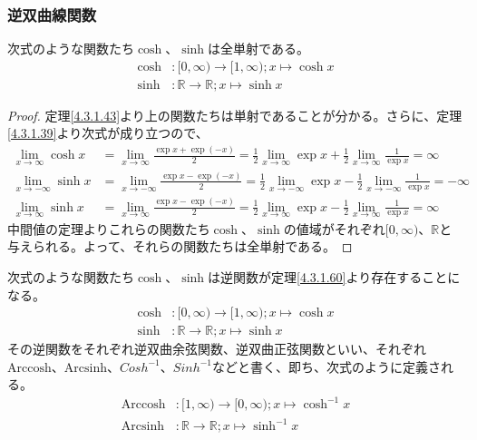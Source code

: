 \documentclass[dvipdfmx]{jsarticle}
\begin{document}
\subsubsection{逆双曲線関数}%
\begin{thm}\label{4.3.1.60} 次式のような関数たち$\cosh$、$\sinh$は全単射である。
\begin{align*}
\cosh&:[ 0,\infty) \rightarrow [ 1,\infty);x \mapsto \cosh x\\
\sinh&:\mathbb{R} \rightarrow \mathbb{R};x \mapsto \sinh x
\end{align*}
\end{thm}
\begin{proof} 定理\ref{4.3.1.43}より上の関数たちは単射であることが分かる。さらに、定理\ref{4.3.1.39}より次式が成り立つので、
\begin{align*}
\lim_{x \rightarrow \infty}{\cosh x} &= \lim_{x \rightarrow \infty}\frac{\exp x + \exp( - x)}{2} = \frac{1}{2}\lim_{x \rightarrow \infty}{\exp x} + \frac{1}{2}\lim_{x \rightarrow \infty}\frac{1}{\exp x} = \infty\\
\lim_{x \rightarrow - \infty}{\sinh x} &= \lim_{x \rightarrow - \infty}\frac{\exp x - \exp( - x)}{2} = \frac{1}{2}\lim_{x \rightarrow - \infty}{\exp x} - \frac{1}{2}\lim_{x \rightarrow - \infty}\frac{1}{\exp x} = - \infty\\
\lim_{x \rightarrow \infty}{\sinh x} &= \lim_{x \rightarrow \infty}\frac{\exp x - \exp( - x)}{2} = \frac{1}{2}\lim_{x \rightarrow \infty}{\exp x} - \frac{1}{2}\lim_{x \rightarrow \infty}\frac{1}{\exp x} = \infty
\end{align*}
中間値の定理よりこれらの関数たち$\cosh$、$\sinh$の値域がそれぞれ$[ 0,\infty)$、$\mathbb{R}$と与えられる。よって、それらの関数たちは全単射である。
\end{proof}
\begin{dfn}
次式のような関数たち$\cosh$、$\sinh$は逆関数が定理\ref{4.3.1.60}より存在することになる。
\begin{align*}
\cosh&:[ 0,\infty) \rightarrow [ 1,\infty);x \mapsto \cosh x\\
\sinh&:\mathbb{R} \rightarrow \mathbb{R};x \mapsto \sinh x
\end{align*}
その逆関数をそれぞれ逆双曲余弦関数、逆双曲正弦関数といい、それぞれ$\mathrm{Arccosh}$、$\mathrm{Arcsinh}$、${Cosh}^{- 1}$、${Sinh}^{- 1}$などと書く、即ち、次式のように定義される。
\begin{align*}
\mathrm{Arccosh}&:[ 1,\infty) \rightarrow [ 0,\infty);x \mapsto \cosh^{- 1}x\\
\mathrm{Arcsinh}&:\mathbb{R} \rightarrow \mathbb{R};x \mapsto \sinh^{- 1}x
\end{align*}
\end{dfn}
\end{document}
